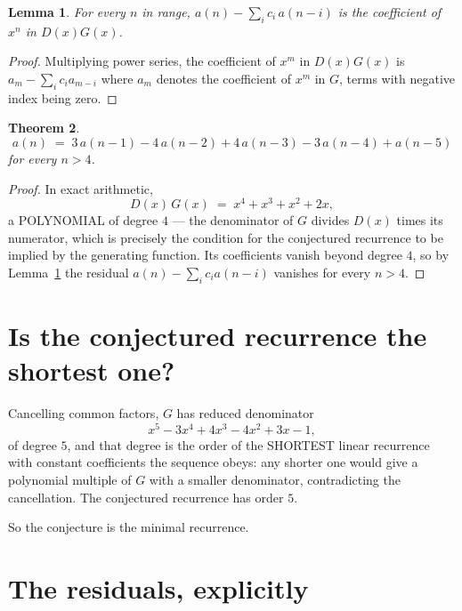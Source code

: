 \documentclass[11pt,a4paper]{article}
\theoremstyle{plain}
\newtheorem{theorem}{Theorem}
\newtheorem{lemma}[theorem]{Lemma}
\theoremstyle{definition}
\begin{document}
\begin{lemma}\label{lem:key}
For every $n$ in range, $a(n)-\sum_i c_i\,a(n-i)$ is the coefficient of $x^{n}$ in
$D(x)G(x)$.
\end{lemma}

\begin{proof}
Multiplying power series, the coefficient of $x^{m}$ in $D(x)G(x)$ is
$a_m-\sum_i c_i a_{m-i}$ where $a_m$ denotes the coefficient of $x^{m}$ in $G$, terms with
negative index being zero.
\end{proof}

\begin{theorem}
\[
a(n)\;=\;3\,a(n-1) - 4\,a(n-2) + 4\,a(n-3) - 3\,a(n-4) + a(n-5)
\]
for every $n>4$.
\end{theorem}

\begin{proof}
In exact arithmetic,
\[
D(x)\,G(x)\;=\;x^{4} + x^{3} + x^{2} + 2 x,
\]
a POLYNOMIAL of degree $4$ --- the denominator of $G$ divides $D(x)$ times its numerator,
which is precisely the condition for the conjectured recurrence to be implied by the
generating function. Its coefficients vanish beyond degree $4$, so by
Lemma~\ref{lem:key} the residual $a(n)-\sum_ic_ia(n-i)$ vanishes for every
$n>4$.
\end{proof}

\section{Is the conjectured recurrence the shortest one?}

Cancelling common factors, $G$ has reduced denominator
\[
x^{5} - 3 x^{4} + 4 x^{3} - 4 x^{2} + 3 x - 1,
\]
of degree $5$, and that degree is the order of the SHORTEST linear recurrence with
constant coefficients the sequence obeys: any shorter one would give a polynomial multiple of
$G$ with a smaller denominator, contradicting the cancellation. The conjectured recurrence has
order $5$.

So the conjecture is the minimal recurrence.

\section{The residuals, explicitly}
\end{document}

